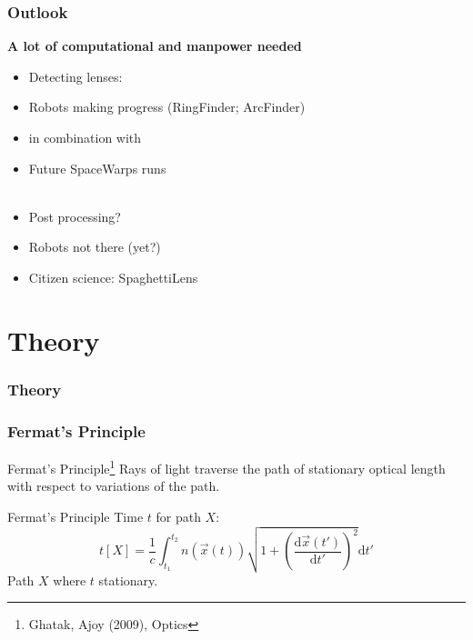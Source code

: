 \documentclass{beamer}
\newcommand{\aitem}{\item[$\Rightarrow$]}
\newcommand{\nitem}{\item[]}
\begin{document}
\begin{frame}
  \frametitle{Outlook}
	
	\textbf{A lot of computational and manpower needed}
	
  \begin{itemize}
			
		\nitem Detecting lenses:
		\item Robots making progress (RingFinder; ArcFinder)
		\nitem in combination with
		\item Future SpaceWarps runs \\~\\
		
		\nitem Post processing?
		\item Robots not there (yet?)
		\aitem Citizen science: SpaghettiLens

  \end{itemize}
\end{frame}




\section{Theory}
\begin{frame}
  \frametitle{Theory}

\end{frame}



\begin{frame}
  \frametitle{Fermat’s Principle}
  \begin{block}{Fermat’s Principle\footnote{Ghatak, Ajoy (2009), Optics}}
    Rays of light traverse the path of stationary optical length\\
    with respect to variations of the path.
    
  \end{block}

  \begin{block}{Fermat’s Principle}
    Time $t$ for path $X$:
    $$t\left[X\right] = \frac{1}{c}\int_{t_1}^{t_2}n\left(\vec{x}\left(t\right)\right)\sqrt{1+\left(\frac{\text{d}\vec{x}\left(t'\right)}{\text{d}t'}\right)^2}\text{d}t'$$
    Path $X$ where $t$ stationary.
  \end{block}
\end{frame}
\end{document}
